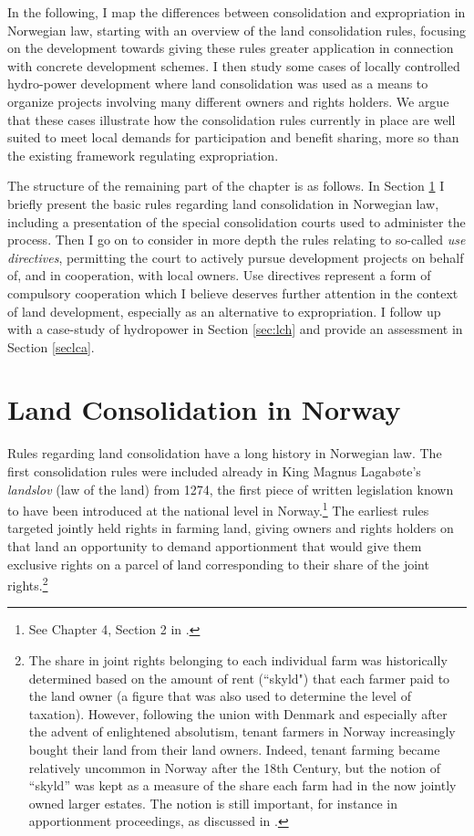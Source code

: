 {In the following, I map the differences between consolidation and expropriation in Norwegian law, starting with an overview of the land consolidation rules, focusing on the development towards giving these rules greater application in connection with concrete development schemes. I then study some cases of locally controlled hydro-power development where land consolidation was used as a means to organize projects involving many different owners and rights holders. We argue that these cases illustrate how the consolidation rules currently in place are well suited to meet local demands for participation and benefit sharing, more so than the existing framework regulating expropriation.

The structure of the remaining part of the chapter is as follows. In Section \ref{sec:lcc} I briefly present the basic rules regarding land consolidation in Norwegian law, including a presentation of the special consolidation courts used to administer the process. Then I go on to consider in more depth the rules relating to so-called \emph{use directives}, permitting the court to actively pursue development projects on behalf of, and in cooperation, with local owners. Use directives represent a form of compulsory cooperation which I believe deserves further attention in the context of land development, especially as an alternative to expropriation. I follow up with a case-study of hydropower in Section \ref{sec:lch} and provide an assessment in Section \ref{seclca}. }

\section{Land Consolidation in Norway}\label{sec:lcc}

Rules regarding land consolidation have a long history in Norwegian law. The first consolidation rules were included already in King Magnus Lagabøte's \emph{landslov} (law of the land) from 1274, the first piece of written legislation known to have been introduced at the national level in Norway.\footnote{See Chapter 4, Section 2 in \cite{nou02}.} The earliest rules targeted jointly held rights in farming land, giving owners and rights holders on that land an opportunity to demand apportionment that would give them exclusive rights on a parcel of land corresponding to their share of the joint rights.\footnote{The share in joint rights belonging to each individual farm was historically determined based on the amount of rent (``skyld") that each farmer paid to the land owner (a figure that was also used to determine the level of taxation). However, following the union with Denmark and especially after the advent of enlightened absolutism, tenant farmers in Norway increasingly bought their land from their land owners.  Indeed, tenant farming became relatively uncommon in Norway after the 18th Century, but the notion of ``skyld'' was kept as a measure of the share each farm had in the now jointly owned larger estates. The notion is still important, for instance in apportionment proceedings, as discussed in \cite{ravna09a}.}

